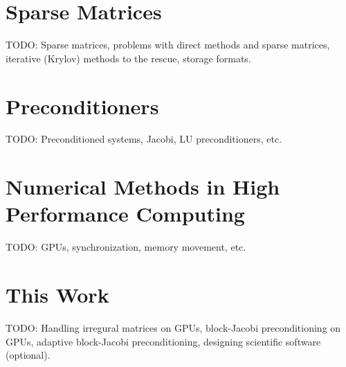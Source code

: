 


\section{Sparse Matrices}
TODO: Sparse matrices, problems with direct methods and sparse matrices,
      iterative (Krylov) methods to the rescue, storage formats.

\section{Preconditioners}
TODO: Preconditioned systems, Jacobi, LU preconditioners, etc.

\section{Numerical Methods in High Performance Computing}
TODO: GPUs, synchronization, memory movement, etc.

\section{This Work}
TODO: Handling irregural matrices on GPUs, block-Jacobi preconditioning on GPUs,
      adaptive block-Jacobi preconditioning, designing scientific software
      (optional).
